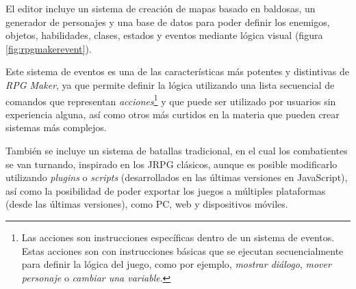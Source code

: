 \smallskip

El editor incluye un sistema de creación de mapas basado en baldosas, un generador de personajes y una base de datos para poder definir los enemigos, objetos, habilidades, clases, estados y eventos mediante lógica visual (figura \ref{fig:rpgmakerevent}). 

\medskip

Este sistema de eventos es una de las características más potentes y distintivas de \textit{RPG Maker}, ya que permite definir la lógica utilizando una lista secuencial de comandos que representan \textit{acciones}\footnote{Las acciones son instrucciones específicas dentro de un sistema de eventos. Estas acciones son  con instrucciones básicas que se ejecutan secuencialmente para definir la lógica del juego, como por ejemplo, \textit{mostrar diálogo}, \textit{mover personaje} o \textit{cambiar una variable}.} y que puede ser utilizado por usuarios sin experiencia alguna, así como otros más curtidos en la materia que pueden crear sistemas más complejos.

\medskip

También se incluye un sistema de batallas tradicional, en el cual los combatientes se van turnando, inspirado en los JRPG clásicos, aunque es posible modificarlo utilizando \textit{plugins} o \textit{scripts} (desarrollados en las últimas versiones en JavaScript), así como la posibilidad de poder exportar los juegos a múltiples plataformas (desde las últimas versiones), como PC, web y dispositivos móviles.

\medskip


